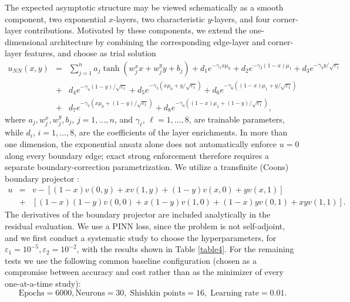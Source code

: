 \documentclass[11pt]{article}
\providecommand{\e}{\varepsilon}
\theoremstyle{plain}
\theoremstyle{definition}
\theoremstyle{remark}
\numberwithin{equation}{section}
\begin{document}
The expected asymptotic structure may be viewed schematically as a smooth component, two exponential $x$-layers, two characteristic $y$-layers, and four corner-layer contributions. Motivated by these components, we extend the one-dimensional architecture by combining the corresponding edge-layer and corner-layer features, and choose as trial solution
%
\begin{eqnarray*}
u_{NN}(x,y) &=& \sum_{j=1}^n a_j \tanh(w^x_j x + w^y_j y + b_j) + d_1 e^{-\gamma_1 x \mu_0} + d_2 e^{-\gamma_2 (1-x) \mu_1} + d_3 e^{-\gamma_3 y/{\sqrt{\e_1}} }\\
&+&  d_4 e^{-\gamma_4 (1-y)/\sqrt{\e_1}}+ d_5 e^{-\gamma_5 (x \mu_0 + y /\sqrt{\e_1})} + d_6 e^{-\gamma_6 ((1-x) \mu_1 + y /\sqrt{\e_1})}\\ 
&+& d_7 e^{-\gamma_7( x \mu_0 + (1-y) /\sqrt{\e_1})} + d_8 e^{-\gamma_8 ( (1-x)\mu_1 + (1-y) /\sqrt{\e_1})},
\end{eqnarray*}
%
where $a_j, w_j^x, w_j^y, b_j$, $j=1,\ldots,n$, and $\gamma_{\ell}$, $\ell=1,\ldots,8$, are trainable parameters, while $d_i$, $i=1,\ldots,8$, are the coefficients of the layer enrichments. In more than one dimension, the exponential ansatz alone does not automatically enforce $u=0$ along every boundary edge; exact strong enforcement therefore requires a separate boundary-correction parametrization. We utilize a transfinite (Coons) boundary projector \cite{Coons}:
\begin{eqnarray*}
   u &=& v - \left[(1-x)v(0,y)+xv(1,y)+(1-y)v(x,0)+yv(x,1)\right] \\
         &+& [(1-x)(1-y)v(0,0)+x(1-y)v(1,0) + (1-x)yv(0,1)+xyv(1,1)].
\end{eqnarray*}
%
The derivatives of the boundary projector are included analytically in the residual evaluation. 
%
We use a PINN loss, since the problem is not self-adjoint, and we first conduct a systematic study to choose the hyperparameters, for $\e_1 = 10^{-5}, \e_2 = 10^{-2}$, with the results shown in Table \ref{table4}. For the remaining tests we use the following common baseline configuration (chosen as a compromise between accuracy and cost rather than as the minimizer of every one-at-a-time study):
%
$$
\text{Epochs} = 6000, \text{Neurons} = 30, \; \text{Shishkin points} = 16, \; \text{Learning rate} = 0.01.
$$
\end{document}
